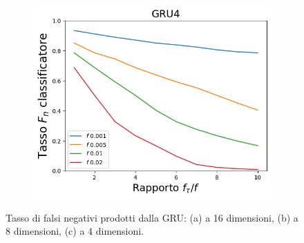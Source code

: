 \documentclass[../../main.tex]{subfiles}
\begin{document}
\begin{figure}[H]
\begin{subfigure}[b]{0.49\textwidth}
            \label{fig:SLBFFNR_GRU8}
        \end{subfigure}
        \begin{subfigure}[b]{0.49\textwidth}
            \centering
            \includegraphics[width = \textwidth]{immagini/7/SLBF/GRU4_FNR.png}
            \caption{}
            \label{fig:SLBFFNR_GRU4}
        \end{subfigure}
        \caption{Tasso di falsi negativi prodotti dalla GRU: (a) a 16 dimensioni, (b) a 8 dimensioni, (c) a 4 dimensioni.}
        \label{fig:SLBFFNR_GRU}
    \end{figure}
\end{document}
